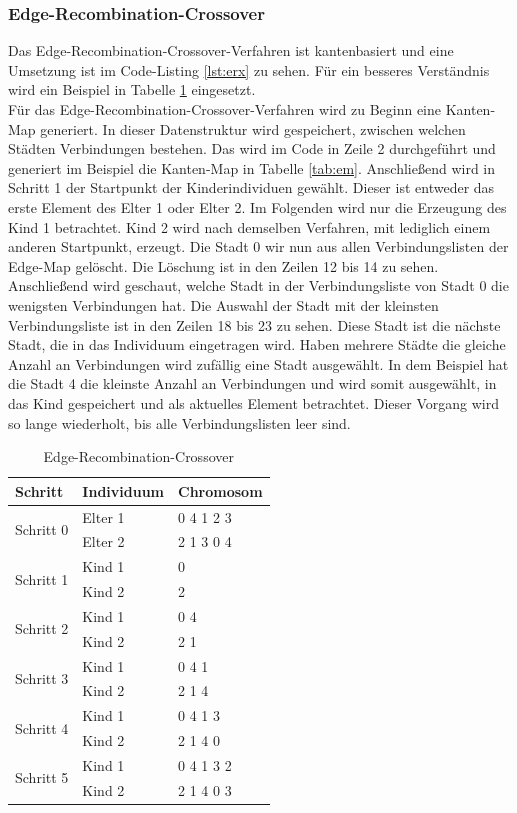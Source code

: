 \subsubsection{Edge-Recombination-Crossover}
Das Edge-Recombination-Crossover-Verfahren \cite[S. 276]{schoeneburg} ist kantenbasiert und eine Umsetzung ist im Code-Listing \ref{lst:erx} zu sehen. Für ein besseres Verständnis wird ein Beispiel in Tabelle \ref{tab:erx2} eingesetzt.\\
Für das Edge-Recombination-Crossover-Verfahren wird zu Beginn eine Kanten-Map generiert. In dieser Datenstruktur wird gespeichert, zwischen welchen Städten Verbindungen bestehen. Das wird im Code in Zeile 2 durchgeführt und generiert im Beispiel die Kanten-Map in Tabelle \ref{tab:em}.
Anschließend wird in Schritt 1 der Startpunkt der Kinderindividuen gewählt. Dieser ist entweder das erste Element des Elter 1 oder Elter 2. Im Folgenden wird nur die Erzeugung des Kind 1 betrachtet. Kind 2 wird nach demselben Verfahren, mit lediglich einem anderen Startpunkt, erzeugt.
Die Stadt 0 wir nun aus allen Verbindungslisten der Edge-Map gelöscht. Die Löschung ist in den Zeilen 12 bis 14 zu sehen. Anschließend wird geschaut, welche Stadt in der Verbindungsliste von Stadt 0 die wenigsten Verbindungen hat. Die Auswahl der Stadt mit der kleinsten Verbindungsliste ist in den Zeilen 18 bis 23 zu sehen. Diese Stadt ist die nächste Stadt, die in das Individuum eingetragen wird. Haben mehrere Städte die gleiche Anzahl an Verbindungen wird zufällig eine Stadt ausgewählt. In dem Beispiel hat die Stadt 4 die kleinste Anzahl an Verbindungen und wird somit ausgewählt, in das Kind gespeichert und als aktuelles Element betrachtet. Dieser Vorgang wird so lange wiederholt, bis alle Verbindungslisten leer sind.

\begin{table}[!htb]
\centering
\caption{Edge-Recombination-Crossover}
\begin{tabularx}{0.5\textwidth}{l|l|l}
Schritt & Individuum & Chromosom\\
\hline
\multirow{2}{*}{Schritt 0}
		& Elter 1 & 0 4 1 2 3\\
		& Elter 2 & 2 1 3 0 4\\
\hline
\multirow{2}{*}{Schritt 1}
		& Kind 1 & 0\\
		& Kind 2 & 2\\
\hline
\multirow{2}{*}{Schritt 2}
		& Kind 1 & 0 4 \\
		& Kind 2 & 2 1 \\
\hline
\multirow{2}{*}{Schritt 3}
		& Kind 1 & 0 4 1\\
		& Kind 2 & 2 1 4\\
\hline
\multirow{2}{*}{Schritt 4}
		& Kind 1 & 0 4 1 3\\
		& Kind 2 & 2 1 4 0\\
\hline
\multirow{2}{*}{Schritt 5}
		& Kind 1 & 0 4 1 3 2\\
		& Kind 2 & 2 1 4 0 3\\
\end{tabularx}
\label{tab:erx2}
\end{table}

